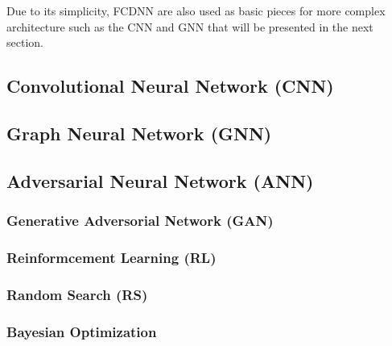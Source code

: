 Due to its simplicity, FCDNN are also used as basic pieces for more complex architecture such as the CNN and GNN that will be presented in the next section.

\subsection{Convolutional Neural Network (CNN)}

\subsection{Graph Neural Network (GNN)}

\subsection{Adversarial Neural Network (ANN)}

\subsubsection{Generative Adversorial Network (GAN)}

\subsubsection{Reinformcement Learning (RL)}

\subsubsection{Random Search (RS)}

\subsubsection{Bayesian Optimization}
